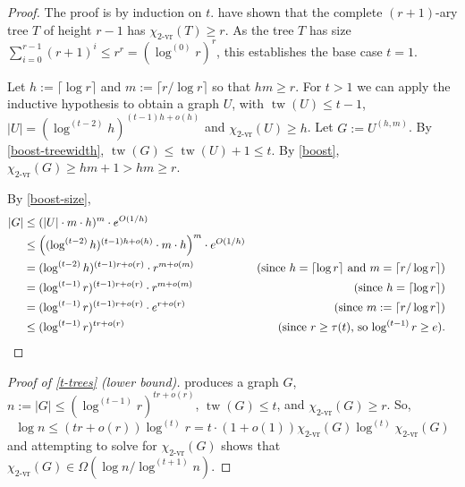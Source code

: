 \documentclass[kpfonts]{patmorin}
\DeclareMathOperator{\tw}{tw}
\newcommand{\rn}[1]{\chi_{\operatorname{#1-vr}}}
\newcommand{\trn}{\rn{2}}
\theoremstyle{named}
\begin{document}
\begin{proof}
    The proof is by induction on $t$.  \citet{karpas.neiman.ea:on} have shown that the complete $(r+1)$-ary tree $T$ of height $r-1$ has $\trn(T)\ge r$. As the tree $T$ has size $\sum_{i=0}^{r-1} (r+1)^i \le r^r=(\log^{(0)}r)^{r}$,  this establishes the base case $t=1$.

    Let $h:=\lceil\log r\rceil$ and $m:=\lceil r/\log r\rceil$ so that $hm\ge r$.  For $t>1$ we can apply the inductive hypothesis to obtain a graph $U$, with $\tw(U)\le t-1$, $|U|=(\log^{(t-2)} h)^{(t-1)h+o(h)}$ and $\trn(U)\ge h$.
    Let $G:=U^{(h,m)}$.  By \cref{boost-treewidth}, $\tw(G)\le \tw(U)+1\le t$.  By \cref{boost},
    $\trn(G)\ge hm+1 > hm \ge r$.

    By \cref{boost-size},
    \begin{align*}
        |G| & \le (|U|\cdot m\cdot h)^{m}\cdot e^{O(1/h)} \\
        & \le \left((\log^{(t-2)} h)^{(t-1)h + o(h)}\cdot m\cdot h\right)^{m}\cdot e^{O(1/h)} \\
        & = (\log^{(t-2)} h)^{(t-1)r + o(r)}\cdot r^{m+o(m)}
        & \text{(since $h=\lceil\log r\rceil$ and $m=\lceil r/\log r\rceil$)}\\
        & = (\log^{(t-1)} r)^{(t-1)r + o(r)}\cdot r^{m+o(m)}
         & \text{(since $h=\lceil\log r\rceil$)} \\
        & = (\log^{(t-1)} r)^{(t-1)r + o(r)}\cdot e^{r+o(r)}
        & \text{(since $m:=\lceil r/\log r\rceil$)}\\
        & \le (\log^{(t-1)} r)^{tr + o(r)} & \text{(since $r\ge \tau(t)$, so $\log^{(t-1)} r\ge e$).} & \qedhere
    \end{align*}
\end{proof}

\begin{proof}[Proof of \cref{t-trees} (lower bound)]
     produces a graph $G$, $n:=|G|\le (\log^{(t-1)} r)^{tr+o(r)}$, $\tw(G)\le t$, and $\trn(G)\ge r$.  So,
    \[
        \log n \le (tr+o(r))\log^{(t)} r
        = t\cdot(1+o(1))\trn(G)\log^{(t)} \trn(G)
    \]
    and attempting to solve for $\trn(G)$ shows that $\trn(G)\in \Omega(\log n/\log^{(t+1)} n)$.
\end{proof}
\end{document}
